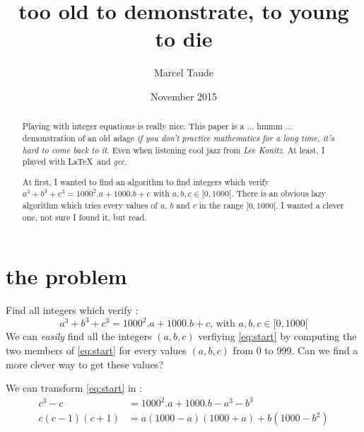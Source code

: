 




\title{too old to demonstrate, to young to die}
\author{Marcel Taude}
\date{November 2015}

\begin{abstract}
	Playing with integer equations is really nice. This paper is a ... hmmm ... demonstration of an old adage \emph{if you don't practice mathematics for a long time, it's hard to come back to it}. Even when listening cool jazz from \emph{Lee Konitz}. At least, I played with \LaTeX\ and \emph{gcc}.

	At first, I wanted to find an algorithm to find integers which verify $a^3 + b^3 + c^3 = 1000^2.a + 1000.b + c$ with $a, b, c \in [0, 1000[$. There is an obvious lazy algorithm which tries every values of $a$, $b$ and $c$ in the range $[0, 1000[$. I wanted a clever one, not sure I found it, but read.
\end{abstract}	

\maketitle

\tableofcontents



\section{the problem}
Find all integers which verify :
\begin{equation}\label{eq:start}
	a^3 + b^3 + c^3 = 1000^2.a + 1000.b + c \text{, with } a, b, c \in [0, 1000[
\end{equation}
We can \emph{easily} find all the integers $(a, b, c)$ verfiying \eqref{eq:start} by computing the two members of \eqref{eq:start} for every values $(a, b, c)$ from 0 to 999. Can we find a more clever way to get these values?

We can transform \eqref{eq:start} in :
\begin{equation}\label{eq:second}
\begin{split}
	c^3 - c &= 1000^2.a + 1000.b - a^3 - b^3 \\
	c(c - 1)(c + 1) &= a(1000 - a)(1000 + a) + b(1000 - b^2)
 \end{split}
\end{equation}

